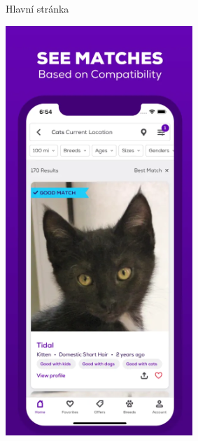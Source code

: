 \documentclass[12pt,a4paper]{report}
\begin{document}
\begin{figure}[h!]
\begin{subfigure}{0.22\textwidth}
        \caption{Hlavní stránka} %
        \label{fig:obrazek1}
    \end{subfigure}
    \hfill
    \begin{subfigure}{0.22\textwidth}
        \centering
        \includegraphics[width=\textwidth]{img/petfinder2.png} %

\end{subfigure}
\end{figure}
\end{document}
